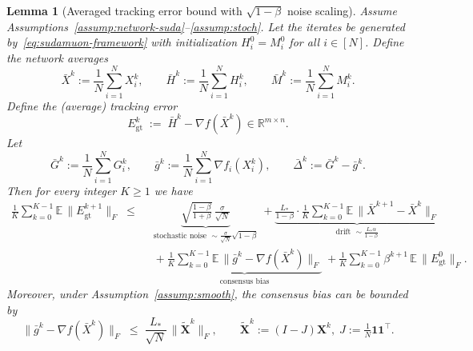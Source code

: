 \documentclass{article}
\newtheorem{lemma}{Lemma}
\begin{document}
\begin{lemma}[Averaged tracking error bound with $\sqrt{1-\beta}$ noise scaling]
\label{lem:sudamuon-avg-gt-error-decomposition}
Assume Assumptions~\ref{assump:network-suda}--\ref{assump:stoch}.
Let the iterates be generated by~\eqref{eq:sudamuon-framework} with initialization $H_i^0=M_i^0$ for all $i\in[N]$.
Define the network averages
\[
\bar X^k:=\frac{1}{N}\sum_{i=1}^N X_i^k,\qquad
\bar H^k:=\frac{1}{N}\sum_{i=1}^N H_i^k,\qquad
\bar M^k:=\frac{1}{N}\sum_{i=1}^N M_i^k.
\]
Define the (average) tracking error
\[
E_{\mathrm{gt}}^k\;:=\;\bar H^k-\nabla f(\bar X^k)\in\mathbb{R}^{m\times n}.
\]
Let
\[
\bar G^k:=\frac{1}{N}\sum_{i=1}^N G_i^k,\qquad
\bar g^k:=\frac{1}{N}\sum_{i=1}^N \nabla f_i(X_i^k),\qquad
\bar\Delta^k:=\bar G^k-\bar g^k.
\]
Then for every integer $K\ge 1$ we have
\begin{equation}
\label{eq:sudamuon-avg-gt-error-decomp-main}
\begin{split}
\frac{1}{K}\sum_{k=0}^{K-1}\mathbb{E}\,\|E_{\mathrm{gt}}^{k+1}\|_F
\;\le\;&\;
\underbrace{\sqrt{\tfrac{1-\beta}{1+\beta}}\,\tfrac{\sigma}{\sqrt{N}}}_{\text{stochastic noise }\sim \frac{\sigma}{\sqrt N}\sqrt{1-\beta}}
\;+
\underbrace{\frac{L_*}{1-\beta}\cdot \frac{1}{K}\sum_{k=0}^{K-1}\mathbb{E}\,\|\bar X^{k+1}-\bar X^k\|_F}_{\text{drift }\sim \frac{L_*\alpha}{1-\beta}}
\\&\;+
\underbrace{\frac{1}{K}\sum_{k=0}^{K-1}\mathbb{E}\,\|\bar g^k-\nabla f(\bar X^k)\|_F}_{\text{consensus bias}}
\;+
\frac{1}{K}\sum_{k=0}^{K-1}\beta^{k+1}\,\mathbb{E}\,\|E_{\mathrm{gt}}^{0}\|_F.
\end{split}
\end{equation}
Moreover, under Assumption~\ref{assump:smooth}, the consensus bias can be bounded by
\begin{equation}
\label{eq:sudamuon-avg-gt-error-consensus-bias}
\|\bar g^k-\nabla f(\bar X^k)\|_F
\;\le\;
\frac{L_*}{\sqrt{N}}\,\|\tilde{\mathbf X}^k\|_F,
\qquad
\tilde{\mathbf X}^k:=(I-J)\mathbf X^k,\; J:=\tfrac{1}{N}\mathbf 1\mathbf 1^\top.
\end{equation}
\end{lemma}
\end{document}
